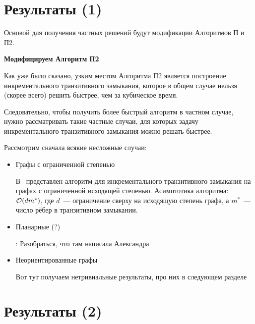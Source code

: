 \section{Результаты (1)}

Основой для получения частных решений будут модификации Алгоритмов П и П2.

{\bf Модифицируем Алгоритм П2}

Как уже было сказано, узким местом Алгоритма П2 является построение инкрементального транзитивного замыкания, которое в общем случае нельзя (скорее всего) решить быстрее, чем за кубическое время.

Следовательно, чтобы получить более быстрый алгоритм в частном случае, нужно рассматривать такие частные случаи, для которых задачу инкрементального транзитивного замыкания можно решать быстрее.

Рассмотрим сначала всякие несложные случаи:

\begin{itemize}
    \item Графы с ограниченной степенью

    В~\cite{Yellin1993} представлен алгоритм для инкрементального транзитивного замыкания на графах с ограниченной исходящей степенью. Асимптотика алгоритма: $\mathcal{O}(d m^{*})$, где $d$~--- ограничение сверху на исходящую степень графа, а $m^{*}$~--- число рёбер в транзитивном замыкании.
    \item Планарные (?)

    \TODO: Разобраться, что там написала Александра 
    
    \item Неориентированные графы

    Вот тут получаем нетривиальные результаты, про них в следующем разделе
\end{itemize}





\section{Результаты (2)}

